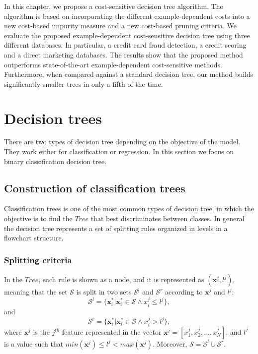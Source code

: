 In this chapter, we propose a cost-sensitive decision tree algorithm. The algorithm is 
based on incorporating the different example-dependent costs into a new cost-based impurity measure 
and a new cost-based pruning criteria. We evaluate the proposed example-dependent 
cost-sensitive decision tree using three different databases. In particular, a credit card fraud 
detection, a credit scoring and a direct marketing databases. The results show that the proposed 
method outperforms state-of-the-art example-dependent cost-sensitive methods. Furthermore, when 
compared against a standard decision tree, our method builds significantly smaller trees in only a 
fifth of the time.

\section{Decision trees}
\label{sec:8:dt}

There are two types of decision tree depending on the objective of the model. They work either for 
classification or regression. In this section we focus on binary classification decision tree.

\subsection{Construction of classification trees}

Classification trees is one of the most common types of decision tree, in which the objective 
is to find the $Tree$ that best discriminates between classes. In general the decision tree 
represents a set of splitting rules organized in levels in a flowchart structure.

\subsubsection{Splitting criteria}

In the $Tree$, each rule is shown as a node, and it is represented as $(\mathbf{x}^j,l^j)$, meaning 
that the 
set $\mathcal{S}$ is split in two sets $\mathcal{S}^l$ and $\mathcal{S}^r$ according to 
$\mathbf{x}^j$ and $l^j$:
\begin{equation}
  \mathcal{S}^l = \{\mathbf{x}_i^* \vert \mathbf{x}_i^* \in \mathcal{S} \wedge x^j_i \le l^j \},
\end{equation}
and
\begin{equation}
  \mathcal{S}^r = \{\mathbf{x}_i^* \vert \mathbf{x}_i^* \in \mathcal{S} \wedge x^j_i > l^j \},
\end{equation}
where $\mathbf{x}^j$ is the $j^{th}$ feature represented in the vector 
$\mathbf{x}^j=[x_1^j,x_2^j,...,x_N^j]$, and $l^j$ is a value such that $min(\mathbf{x}^j) \le l^j < 
max(\mathbf{x}^j)$. Moreover, $\mathcal{S} = \mathcal{S}^l \cup \mathcal{S}^r$.

